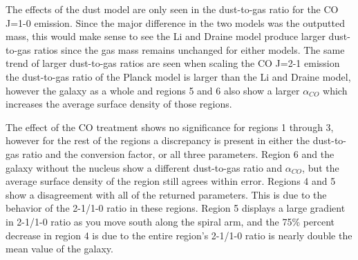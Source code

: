 The effects of the dust model are only seen in the dust-to-gas ratio for the CO J=1-0 emission.  Since the major difference in the two models was the outputted mass, this would make sense to see the Li and Draine model produce larger dust-to-gas ratios since the gas mass remains unchanged for either models.  The same trend of larger dust-to-gas ratios are seen when scaling the CO J=2-1 emission the dust-to-gas ratio of the Planck model is larger than the Li and Draine model, however the galaxy as a whole and regions 5 and 6 also show a larger $\alpha_{CO}$ which increases the average surface density of those regions.
  
The effect of the CO treatment shows no significance for regions 1 through 3, however for the rest of the regions a discrepancy is present in either the dust-to-gas ratio and the conversion factor, or all three parameters.  Region 6 and the galaxy without the nucleus show a different dust-to-gas ratio and $\alpha_{CO}$, but the average surface density of the region still agrees within error.  Regions 4 and 5 show a disagreement with all of the returned parameters.  This is due to the behavior of the 2-1/1-0 ratio in these regions.  Region 5 displays a large gradient in 2-1/1-0 ratio as you move south along the spiral arm, and the 75\% percent decrease in region 4 is due to the entire region's 2-1/1-0 ratio is nearly double the mean value of the galaxy.

